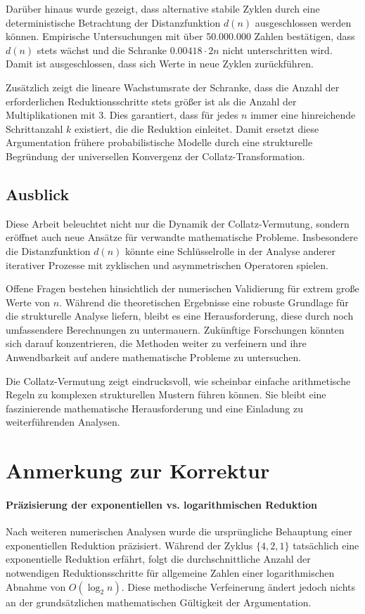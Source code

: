 \documentclass[a4paper,12pt]{article}
\begin{document}
Darüber hinaus wurde gezeigt, dass alternative stabile Zyklen durch eine deterministische Betrachtung der Distanzfunktion \( d(n) \) ausgeschlossen werden können. Empirische Untersuchungen mit über 50.000.000 Zahlen bestätigen, dass \( d(n) \) stets wächst und die Schranke \( 0.00418 \cdot 2n \) nicht unterschritten wird. Damit ist ausgeschlossen, dass sich Werte in neue Zyklen zurückführen.

Zusätzlich zeigt die lineare Wachstumsrate der Schranke, dass die Anzahl der erforderlichen Reduktionsschritte stets größer ist als die Anzahl der Multiplikationen mit 3. Dies garantiert, dass für jedes \( n \) immer eine hinreichende Schrittanzahl \( k \) existiert, die die Reduktion einleitet. Damit ersetzt diese Argumentation frühere probabilistische Modelle durch eine strukturelle Begründung der universellen Konvergenz der Collatz-Transformation.

\subsection{Ausblick}

Diese Arbeit beleuchtet nicht nur die Dynamik der Collatz-Vermutung, sondern eröffnet auch neue Ansätze für verwandte mathematische Probleme. Insbesondere die Distanzfunktion \( d(n) \) könnte eine Schlüsselrolle in der Analyse anderer iterativer Prozesse mit zyklischen und asymmetrischen Operatoren spielen.

Offene Fragen bestehen hinsichtlich der numerischen Validierung für extrem große Werte von \( n \). Während die theoretischen Ergebnisse eine robuste Grundlage für die strukturelle Analyse liefern, bleibt es eine Herausforderung, diese durch noch umfassendere Berechnungen zu untermauern. Zukünftige Forschungen könnten sich darauf konzentrieren, die Methoden weiter zu verfeinern und ihre Anwendbarkeit auf andere mathematische Probleme zu untersuchen.

Die Collatz-Vermutung zeigt eindrucksvoll, wie scheinbar einfache arithmetische Regeln zu komplexen strukturellen Mustern führen können. Sie bleibt eine faszinierende mathematische Herausforderung und eine Einladung zu weiterführenden Analysen.

\section*{Anmerkung zur Korrektur}  

\paragraph{Präzisierung der exponentiellen vs. logarithmischen Reduktion}  
Nach weiteren numerischen Analysen wurde die ursprüngliche Behauptung einer exponentiellen Reduktion präzisiert. Während der Zyklus \( \{4,2,1\} \) tatsächlich eine exponentielle Reduktion erfährt, folgt die durchschnittliche Anzahl der notwendigen Reduktionsschritte für allgemeine Zahlen einer logarithmischen Abnahme von \( O(\log_2 n) \). Diese methodische Verfeinerung ändert jedoch nichts an der grundsätzlichen mathematischen Gültigkeit der Argumentation.
\end{document}
